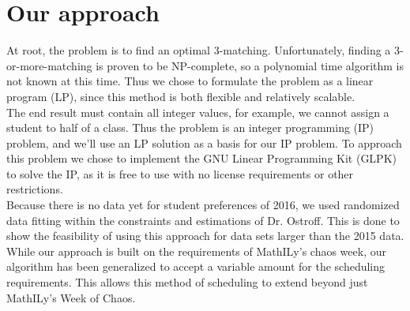 \documentclass[11pt]{article}
\begin{document}
\section{Our approach}
At root, the problem is to find an optimal 3-matching. Unfortunately, finding a 3-or-more-matching is proven to be NP-complete, so a polynomial time algorithm is not known at this time. Thus we chose to formulate the problem as a linear program (LP), since this method is both flexible and relatively scalable.\\
\indent The end result must contain all integer values, for example, we cannot assign a student to half of a class. Thus the problem is an integer programming (IP) problem, and we'll use an LP solution as a basis for our IP problem. To approach this problem we chose to implement the GNU Linear Programming Kit (GLPK) to solve the IP, as it is free to use with no license requirements or other restrictions.\\
\indent Because there is no data yet for student preferences of 2016, we used randomized data fitting within the constraints and estimations of Dr. Ostroff. This is done to show the feasibility of using this approach for data sets larger than the 2015 data. While our approach is built on the requirements of MathILy's chaos week, our algorithm has been generalized to accept a variable amount for the scheduling requirements. This allows this method of scheduling to extend beyond just MathILy's Week of Chaos.\\
\end{document}
